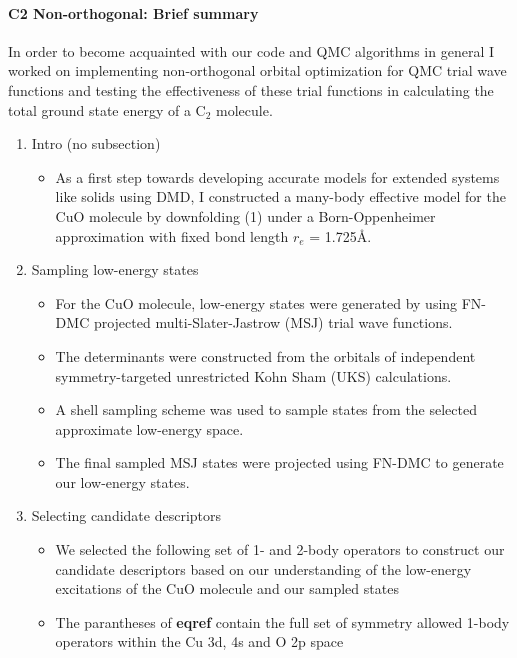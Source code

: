 \documentclass{article}
\begin{document}
\paragraph{C2 Non-orthogonal: Brief summary} In order to become acquainted with our code and QMC algorithms in general I worked on implementing non-orthogonal orbital optimization for QMC trial wave functions and testing the effectiveness of these trial functions in calculating the total ground state energy of a C$_2$ molecule.

\begin{enumerate}
\item Intro (no subsection)
\begin{itemize}
\item As a first step towards developing accurate models for extended systems like solids using DMD, I constructed a many-body effective model for the CuO molecule by downfolding (1) under a Born-Oppenheimer approximation with fixed bond length $r_e$ = 1.725\r{A}.
\end{itemize}

\item Sampling low-energy states
\begin{itemize}

\item For the CuO molecule, low-energy states were generated by
using FN-DMC projected multi-Slater-Jastrow (MSJ) trial wave functions.

\item The determinants were constructed from the orbitals of independent symmetry-targeted unrestricted Kohn Sham (UKS) calculations.

\item A shell sampling scheme was used to sample states from the selected approximate low-energy space.

\item The final sampled MSJ states were projected using FN-DMC to generate our low-energy states.
\end{itemize}

\item Selecting candidate descriptors 
\begin{itemize}
\item We selected the following set of 1- and 2-body operators to construct our candidate descriptors based on our understanding of the low-energy excitations of the CuO molecule and our sampled states

\item The parantheses of \textbf{eqref} contain the full set of symmetry allowed 1-body operators within the Cu 3d, 4s and O 2p space
\end{itemize}


\end{enumerate}
\end{document}

